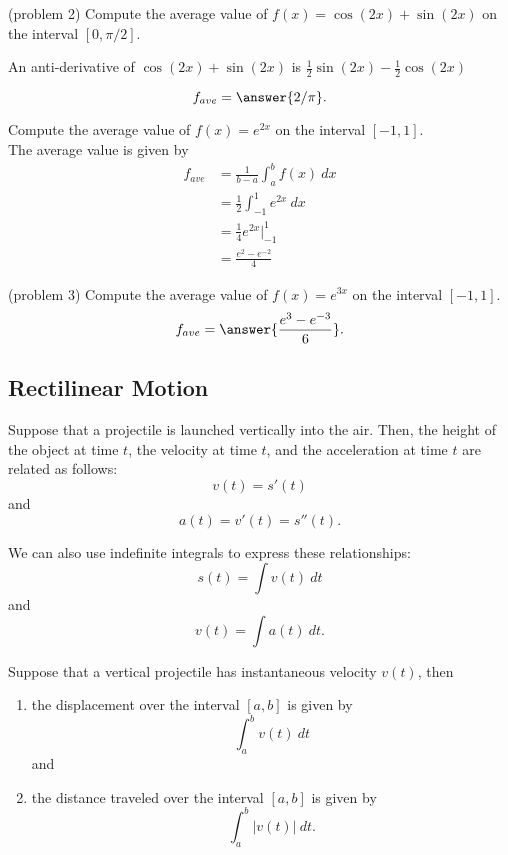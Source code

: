 \documentclass[handout]{ximera}
\begin{document}
\begin{problem}(problem 2)
Compute the average value of $f(x) = \cos(2x) + \sin(2x)$ on the interval $[0,\pi/2]$.
\begin{hint}
An anti-derivative of $\cos(2x) + \sin(2x)$ is  $\tfrac12\sin(2x) - \tfrac12\cos(2x)$
\end{hint}
\[f_{ave} = \answer{2/\pi}.\]
\end{problem} 



\begin{example}[example 3]
Compute the average value of $f(x) = e^{2x}$ on the interval $[-1,1]$.\\
The average value is given by 
\begin{align*}
f_{ave} &= \frac{1}{b-a}\int_a^b f(x) \ dx \\
 & = \frac12\int_{-1}^1 e^{2x} \ dx \\
 & = \frac14 e^{2x} \Bigg|_{-1}^1 \\
  & = \frac{e^2 - e^{-2}}{4}
\end{align*}
\end{example}



\begin{problem}(problem 3)
Compute the average value of $f(x) = e^{3x}$ on the interval $[-1,1]$.
\[f_{ave} = \answer{\frac{e^{3} - e^{-3}}{6}}.\]
\end{problem} 




\subsection{Rectilinear Motion}

Suppose that a projectile is launched vertically into the air.
Then, the height of the object at time $t$, the velocity at time $t$, and the acceleration at time $t$ are related as follows:
\[v(t) = s'(t)\]
and
\[a(t) = v'(t) = s''(t).\]

We can also use indefinite integrals to express these relationships:
\[s(t) = \int v(t) \ dt\]
and
\[v(t) = \int a(t) \ dt.\]


\begin{proposition}
Suppose that a vertical projectile has instantaneous velocity $v(t)$, then
\begin{enumerate}
\item the displacement over the interval $[a,b]$ is given by 
\[\int_a^b v(t) \ dt\]
and
\item the distance traveled over the interval $[a,b]$ is given by 
\[\int_a^b |v(t)| \ dt.\]
\end{enumerate}
\end{proposition}
\end{document}
